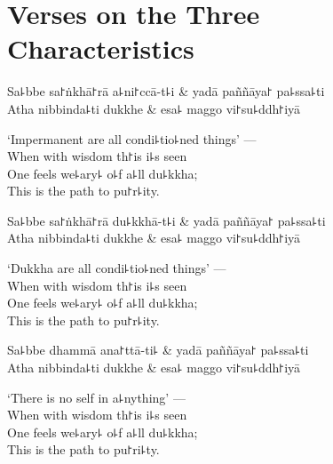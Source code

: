 \clearpage

\chapter{Verses on the Three Characteristics}%

\begin{leader}
\end{leader}

\begin{twochants}
  Sa꜕bbe sa꜓ṅkhā꜓rā a꜕ni꜓ccā-t꜕i & yadā paññāya꜓ pa꜕ssa꜕ti \\
  Atha nibbinda꜕ti dukkhe & esa꜕ maggo vi꜓su꜕ddh꜓iyā \\
\end{twochants}

\begin{english}
  `Impermanent are all condi꜕tio꜕ned things' ---\\
  When with wisdom th꜓is i꜕s seen\\
  One feels we꜕ary꜕ o꜕f a꜕ll du꜕kkha;\\
  This is the path to pu꜓r꜕ity.
\end{english}

\begin{twochants}
  Sa꜕bbe sa꜓ṅkhā꜓rā du꜕kkhā-t꜕i & yadā paññāya꜓ pa꜕ssa꜕ti \\
  Atha nibbinda꜕ti dukkhe & esa꜕ maggo vi꜓su꜕ddh꜓iyā \\
\end{twochants}

\begin{english}
  `Dukkha are all condi꜕tio꜕ned things' ---\\
  When with wisdom th꜓is i꜕s seen\\
  One feels we꜕ary꜕ o꜕f a꜕ll du꜕kkha;\\
  This is the path to pu꜓r꜕ity.
\end{english}

\begin{twochants}
  Sa꜕bbe dhammā ana꜓ttā-ti꜕ & yadā paññāya꜓ pa꜕ssa꜕ti \\
  Atha nibbinda꜕ti dukkhe & esa꜕ maggo vi꜓su꜕ddh꜓iyā \\
\end{twochants}

\begin{english}
  `There is no self in a꜕nything' ---\\
  When with wisdom th꜓is i꜕s seen\\
  One feels we꜕ary꜕ o꜕f a꜕ll du꜕kkha;\\
  This is the path to pu꜓ri꜕ty.
\end{english}

